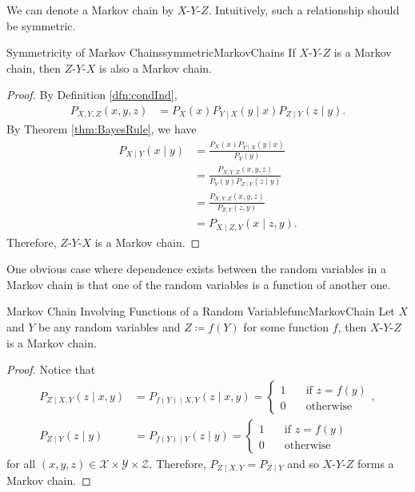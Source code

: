 \documentclass[math]{amznotes}
\theoremstyle{remark}
\begin{document}
We can denote a Markov chain by $X$-$Y$-$Z$. Intuitively, such a relationship should be symmetric.
\begin{probox}{Symmetricity of Markov Chains}{symmetricMarkovChains}
    If $X$-$Y$-$Z$ is a Markov chain, then $Z$-$Y$-$X$ is also a Markov chain.
    \tcblower
    \begin{proof}
        By Definition \ref{dfn:condInd}, 
        \begin{align*}
            P_{X, Y, Z}\left(x, y, z\right) & = P_X\left(x\right)P_{Y \mid X}\left(y \mid x\right)P_{Z \mid Y}\left(z \mid y\right).
        \end{align*}
        By Theorem \ref{thm:BayesRule}, we have 
        \begin{align*}
            P_{X \mid Y}\left(x \mid y\right) & = \frac{P_X\left(x\right)P_{Y \mid X}\left(y \mid x\right)}{P_Y\left(y\right)} \\
            & = \frac{P_{X, Y, Z}\left(x, y, z\right)}{P_Y\left(y\right)P_{Z \mid Y}\left(z \mid y\right)} \\
            & = \frac{P_{X, Y, Z}\left(x, y, z\right)}{P_{Z, Y}\left(z, y\right)} \\
            & = P_{X \mid Z, Y}\left(x \mid z, y\right).
        \end{align*}
        Therefore, $Z$-$Y$-$X$ is a Markov chain.
    \end{proof}
\end{probox}
One obvious case where dependence exists between the random variables in a Markov chain is that one of the random variables is a function of another one.
\begin{probox}{Markov Chain Involving Functions of a Random Variable}{funcMarkovChain}
    Let $X$ and $Y$ be any random variables and $Z \coloneqq f\left(Y\right)$ for some function $f$, then $X$-$Y$-$Z$ is a Markov chain.
    \tcblower
    \begin{proof}
        Notice that 
        \begin{align*}
            P_{Z \mid X, Y}\left(z \mid x, y\right) & = P_{f\left(Y\right) \mid X, Y}\left(z \mid x, y\right) = \begin{cases}
                1 &\quad \textrm{if } z = f\left(y\right) \\
                0 &\quad \textrm{otherwise} 
            \end{cases}, \\
            P_{Z \mid Y}\left(z \mid y\right) & = P_{f\left(Y\right) \mid Y}\left(z \mid y\right) = \begin{cases}
                1 &\quad \textrm{if } z = f\left(y\right) \\
                0 &\quad \textrm{otherwise} 
            \end{cases}
        \end{align*}
        for all $\left(x, y, z\right) \in \mathcal{X} \times \mathcal{Y} \times \mathcal{Z}$. Therefore, $P_{Z \mid X, Y} = P_{Z \mid Y}$ and so $X$-$Y$-$Z$ forms a Markov chain.
    \end{proof}
\end{probox}
\end{document}
